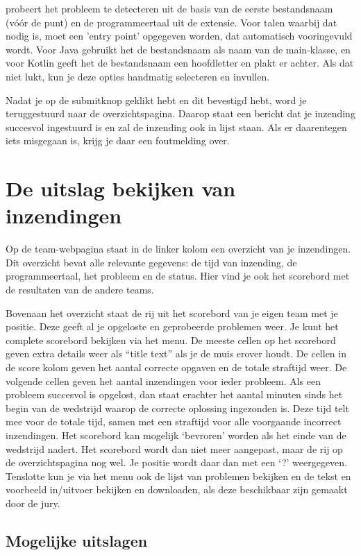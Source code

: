 \DOMjudge probeert het probleem te detecteren uit de
basis van de eerste bestandsnaam (v\'o\'or de punt) en de programmeertaal uit
de extensie. Voor talen waarbij dat nodig is, moet een 'entry point'
opgegeven worden, dat automatisch vooringevuld wordt. Voor Java gebruikt het de bestandsnaam als naam
van de main-klasse, en voor Kotlin geeft het de bestandsnaam
een hoofdletter en plakt er  achter.
Als dat niet lukt, kun je deze opties handmatig selecteren en invullen.

Nadat je op de submitknop geklikt hebt en dit bevestigd hebt, word je
teruggestuurd naar de overzichtspagina. Daarop staat een
bericht dat je inzending succesvol ingestuurd is en zal de inzending
ook in lijst staan. Als er daarentegen iets misgegaan is, krijg je
daar een foutmelding over.

\section{De uitslag bekijken van inzendingen}

Op de team-webpagina staat in de linker kolom een overzicht van je inzendingen.
Dit overzicht bevat alle relevante gegevens: de tijd van inzending, de
programmeertaal, het probleem en de status. Hier vind je ook het scorebord
met de resultaten van de andere teams.

Bovenaan het overzicht staat de rij uit het scorebord van je eigen
team met je positie. Deze geeft al je opgeloste en geprobeerde
problemen weer. Je kunt het complete scorebord bekijken via het menu.
De meeste cellen op het scorebord geven extra details weer als ``title
text'' als je de muis erover houdt. De cellen in de score kolom geven
het aantal correcte opgaven en de totale straftijd weer. De volgende
cellen geven het aantal inzendingen voor ieder probleem. Als een
probleem succesvol is opgelost, dan staat erachter het aantal minuten
sinds het begin van de wedstrijd waarop de correcte oplossing
ingezonden is. Deze tijd telt mee voor de totale tijd, samen met een
straftijd voor alle voorgaande incorrect inzendingen.
Het scorebord kan mogelijk `bevroren' worden als het einde van de
wedstrijd nadert. Het scorebord wordt dan niet meer aangepast, maar de
rij op de overzichtspagina nog wel. Je positie wordt daar dan met een
`?' weergegeven. Tenslotte kun je via het menu ook de lijst van
problemen bekijken en de tekst en voorbeeld in/uitvoer bekijken en
downloaden, als deze beschikbaar zijn gemaakt door de jury.

\subsection{Mogelijke uitslagen}

